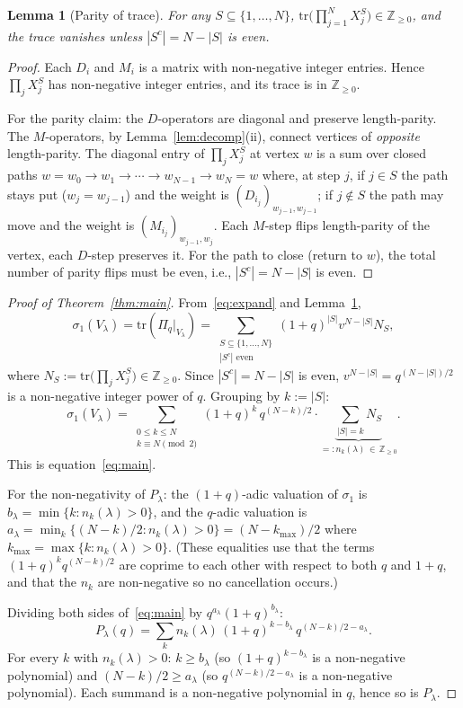 \documentclass[11pt]{article}
\theoremstyle{plain}
\newtheorem{lemma}[theorem]{Lemma}
\theoremstyle{definition}
\theoremstyle{remark}
\newcommand{\Z}{\mathbb{Z}}
\newcommand{\Pibs}{\Pi_q}
\newcommand{\Vlam}{V_\lambda}
\newcommand{\trace}{\mathrm{tr}}
\begin{document}
\begin{lemma}[Parity of trace]
\label{lem:parity}
For any $S \subseteq \{1, \ldots, N\}$, $\trace\bigl(\prod_{j=1}^{N} X_j^{S}\bigr) \in \Z_{\geq 0}$, and the trace vanishes unless $|S^c| = N - |S|$ is even.
\end{lemma}

\begin{proof}
Each $D_i$ and $M_i$ is a matrix with non-negative integer entries. Hence $\prod_j X_j^S$ has non-negative integer entries, and its trace is in $\Z_{\geq 0}$.

For the parity claim: the $D$-operators are diagonal and preserve length-parity. The $M$-operators, by Lemma~\ref{lem:decomp}(ii), connect vertices of \emph{opposite} length-parity. The diagonal entry of $\prod_j X_j^S$ at vertex $w$ is a sum over closed paths $w = w_0 \to w_1 \to \cdots \to w_{N-1} \to w_N = w$ where, at step $j$, if $j \in S$ the path stays put ($w_j = w_{j-1}$) and the weight is $(D_{i_j})_{w_{j-1}, w_{j-1}}$; if $j \notin S$ the path may move and the weight is $(M_{i_j})_{w_{j-1}, w_j}$. Each $M$-step flips length-parity of the vertex, each $D$-step preserves it. For the path to close (return to $w$), the total number of parity flips must be even, i.e., $|S^c| = N - |S|$ is even. \qedhere
\end{proof}

\begin{proof}[Proof of Theorem~\ref{thm:main}]
From~\eqref{eq:expand} and Lemma~\ref{lem:parity},
\[
\sigma_1(\Vlam) = \trace(\Pibs|_\Vlam) = \sum_{\substack{S \subseteq \{1,\ldots,N\} \\ |S^c| \text{ even}}} (1+q)^{|S|} v^{N - |S|} N_S,
\]
where $N_S := \trace\bigl(\prod_j X_j^S\bigr) \in \Z_{\geq 0}$. Since $|S^c| = N - |S|$ is even, $v^{N - |S|} = q^{(N-|S|)/2}$ is a non-negative integer power of $q$. Grouping by $k := |S|$:
\[
\sigma_1(\Vlam) = \sum_{\substack{0 \leq k \leq N \\ k \equiv N \!\pmod 2}} (1+q)^k \, q^{(N-k)/2} \cdot \underbrace{\sum_{|S| = k} N_S}_{=: n_k(\lambda) \, \in \, \Z_{\geq 0}}.
\]
This is equation~\eqref{eq:main}.

For the non-negativity of $P_\lambda$: the $(1+q)$-adic valuation of $\sigma_1$ is $b_\lambda = \min\{k : n_k(\lambda) > 0\}$, and the $q$-adic valuation is $a_\lambda = \min_k\{(N-k)/2 : n_k(\lambda) > 0\} = (N - k_{\max})/2$ where $k_{\max} = \max\{k : n_k(\lambda) > 0\}$. (These equalities use that the terms $(1+q)^k q^{(N-k)/2}$ are coprime to each other with respect to both $q$ and $1+q$, and that the $n_k$ are non-negative so no cancellation occurs.)

Dividing both sides of~\eqref{eq:main} by $q^{a_\lambda}(1+q)^{b_\lambda}$:
\[
P_\lambda(q) = \sum_{k} n_k(\lambda)\,(1+q)^{k - b_\lambda}\, q^{(N-k)/2 - a_\lambda}.
\]
For every $k$ with $n_k(\lambda) > 0$: $k \geq b_\lambda$ (so $(1+q)^{k - b_\lambda}$ is a non-negative polynomial) and $(N-k)/2 \geq a_\lambda$ (so $q^{(N-k)/2 - a_\lambda}$ is a non-negative polynomial). Each summand is a non-negative polynomial in $q$, hence so is $P_\lambda$. \qedhere
\end{proof}
\end{document}
